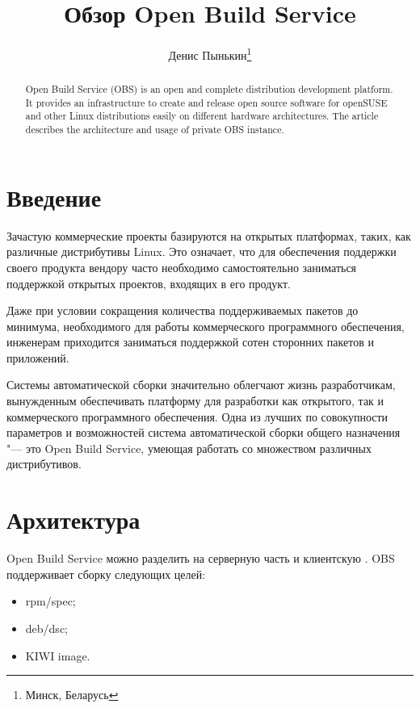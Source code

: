 \documentclass[10pt, a5paper]{article}
\begin{document}
\title{Обзор Open Build Service}%

\author{Денис Пынькин\footnote{Минск, Беларусь}}
\maketitle

\begin{abstract}
Open Build Service (OBS) is an open and complete distribution development platform. It provides an infrastructure to create and release open source software for openSUSE and other Linux distributions easily on different hardware architectures. The article describes the architecture and usage of private OBS instance.
\end{abstract}

\section*{Введение}

Зачастую коммерческие проекты базируются на открытых платформах, таких, как различные дистрибутивы Linux. Это означает, что для обеспечения поддержки своего продукта  вендору часто необходимо самостоятельно заниматься поддержкой открытых проектов, входящих в его продукт.

Даже при условии сокращения количества поддерживаемых пакетов до минимума,  необходимого для работы коммерческого программного обеспечения, инженерам приходится заниматься поддержкой сотен сторонних пакетов и приложений.

Системы автоматической сборки значительно облегчают жизнь разработчикам, вынужденным обеспечивать платформу для разработки как открытого,  так и коммерческого программного обеспечения. Одна из лучших по совокупности параметров и возможностей система автоматической сборки общего назначения "--- это Open Build Service, умеющая работать со множеством различных дистрибутивов.

\section*{Архитектура}

Open Build Service можно разделить на серверную часть и клиентскую \cite{Pynkin1}.
OBS поддерживает сборку следующих целей:

\begin{itemize}
  \item rpm/spec;
  \item deb/dsc;
  \item KIWI image.
\end{itemize}
\end{document}
